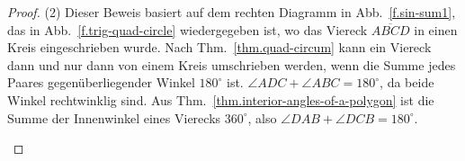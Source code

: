 \begin{proof}(2)
Dieser Beweis basiert auf dem rechten Diagramm in Abb.~\ref{f.sin-sum1}, das in Abb.~\ref{f.trig-quad-circle} wiedergegeben ist, wo das Viereck $\overline{ABCD}$ in einen Kreis eingeschrieben wurde.
Nach Thm.~\ref{thm.quad-circum} kann ein Viereck dann und nur dann von einem Kreis umschrieben werden, wenn die Summe jedes Paares gegenüberliegender Winkel $180^\circ$ ist.
$\angle ADC+\angle ABC=180^\circ$, da beide Winkel rechtwinklig sind. Aus Thm.~\ref{thm.interior-angles-of-a-polygon} ist die Summe der Innenwinkel eines Vierecks $360^\circ$, also $\angle DAB+\angle DCB=180^\circ$. 
\begin{figure}[t]
\begin{center}
\end{center}
\end{figure}
\end{proof}

